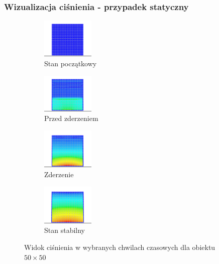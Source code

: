 \documentclass{beamer}
\begin{document}
\begin{frame}
    \frametitle{Wizualizacja ciśnienia - przypadek statyczny}

    \begin{figure}[h]
        \begin{subfigure}{0.4\textwidth}
            \centering
            \includegraphics[width=2.5cm]{pressure_01.png} 
            \caption{Stan początkowy}
        \end{subfigure}
        \begin{subfigure}{0.4\textwidth}
            \centering
            \includegraphics[width=2.5cm]{pressure_02.png}
            \caption{Przed zderzeniem}
        \end{subfigure}
        \begin{subfigure}{0.4\textwidth}
            \centering
            \includegraphics[width=2.5cm]{pressure_03.png}
            \caption{Zderzenie}
        \end{subfigure}
        \begin{subfigure}{0.4\textwidth}
            \centering
            \includegraphics[width=2.5cm]{pressure_04.png}
            \caption{Stan stabilny}
        \end{subfigure}
        
        \caption{Widok ciśnienia w wybranych chwilach czasowych dla obiektu $50 \times 50$}
    \end{figure}

\end{frame}
\end{document}
